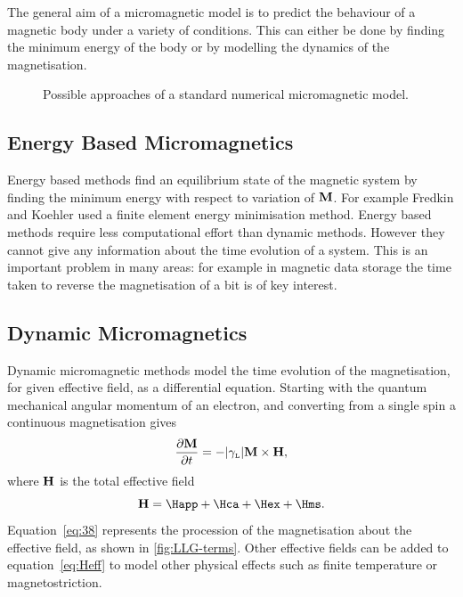 The general aim of a micromagnetic model is to predict the behaviour of a magnetic body under a variety of conditions. This can either be done by finding the minimum energy of the body or by modelling the dynamics of the magnetisation.

\begin{figure}[ht!]
  \centering
  \caption{Possible approaches of a standard numerical micromagnetic model.}
  \label{fig:types-micromag-model}
\end{figure}


\subsection{Energy Based Micromagnetics}
\label{sec:energy-based-micr}

Energy based methods find an equilibrium state of the magnetic system by finding the minimum energy with respect to variation of $\mathbf{M}$. For example Fredkin and Koehler used a finite element energy minimisation method.\cite{Koehler1992} Energy based methods require less computational effort than dynamic methods. However they cannot give any information about the time evolution of a system.\cite{Fidler2000} This is an important problem in many areas: for example in magnetic data storage the time taken to reverse the magnetisation of a bit is of key interest.


\subsection{Dynamic Micromagnetics}
\label{sec:land-lifsch-gilb}

Dynamic micromagnetic methods model the time evolution of the magnetisation, for given effective field, as a differential equation. Starting with the quantum mechanical angular momentum of an electron, and converting from a single spin a continuous magnetisation gives\cite{Kronmuller2003}
\begin{equation}
  \label{eq:38}
  \frac{\partial \mathbf{M}}{\partial t} = - {\left|{\gamma_{\text{\tiny{L}}}} \right|} \mathbf{M} \times \mathbf{H},
\end{equation}
where $\mathbf{H}$ is the total effective field
\begin{equation}
  \Hv = \Happ + \Hca + \Hex + \Hms.
  \label{eq:Heff}
\end{equation}
Equation~\eqref{eq:38} represents the procession of the magnetisation about the effective field, as shown in \autoref{fig:LLG-terms}. Other effective fields can be added to equation~\eqref{eq:Heff} to model other physical effects such as finite temperature or magnetostriction.

